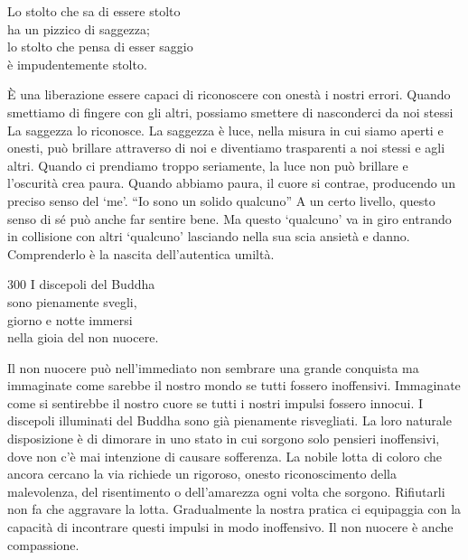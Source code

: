
\begin{dhpVerse}{63}
\label{dhp-63}
Lo stolto che sa di essere stolto\\
ha un pizzico di saggezza;\\
lo stolto che pensa di esser saggio\\
\`{e} impudentemente stolto.
\end{dhpVerse}

\begin{dhpRefl}
\`{E} una liberazione essere capaci di riconoscere con onest\`{a} i nostri errori. Quando smettiamo di fingere con gli altri, possiamo smettere di nasconderci da noi stessi La saggezza lo riconosce. La saggezza \`{e} luce, nella misura in cui siamo aperti e onesti, pu\`{o} brillare attraverso di noi e diventiamo trasparenti a noi stessi e agli altri. Quando ci prendiamo troppo seriamente, la luce non pu\`{o} brillare e l'oscurit\`{a} crea paura. Quando abbiamo paura, il cuore si contrae, producendo un preciso senso del `me'. ``Io sono un solido qualcuno'' A un certo livello, questo senso di s\'{e} pu\`{o} anche far sentire bene. Ma questo `qualcuno' va in giro entrando in collisione con altri `qualcuno' lasciando nella sua scia ansiet\`{a} e danno. Comprenderlo \`{e} la nascita dell'autentica umilt\`{a}.
\end{dhpRefl}


\begin{dhpVerse}{300}
\label{dhp-300}
I discepoli del Buddha\\
sono pienamente svegli,\\
giorno e notte immersi\\
nella gioia del non nuocere.
\end{dhpVerse}

\begin{dhpRefl}
Il non nuocere pu\`{o} nell'immediato non sembrare una grande conquista ma immaginate come sarebbe il nostro mondo se tutti fossero inoffensivi. Immaginate come si sentirebbe il nostro cuore se tutti i nostri impulsi fossero innocui. I discepoli illuminati del Buddha sono gi\`{a} pienamente risvegliati. La loro naturale disposizione \`{e} di dimorare in uno stato in cui sorgono solo pensieri inoffensivi, dove non c'\`{e} mai intenzione di causare sofferenza. La nobile lotta di coloro che ancora cercano la via richiede un rigoroso, onesto riconoscimento della malevolenza, del risentimento o dell'amarezza ogni volta che sorgono. Rifiutarli non fa che aggravare la lotta. Gradualmente la nostra pratica ci equipaggia con la capacit\`{a} di incontrare questi impulsi in modo inoffensivo. Il non nuocere \`{e} anche compassione.
\end{dhpRefl}

